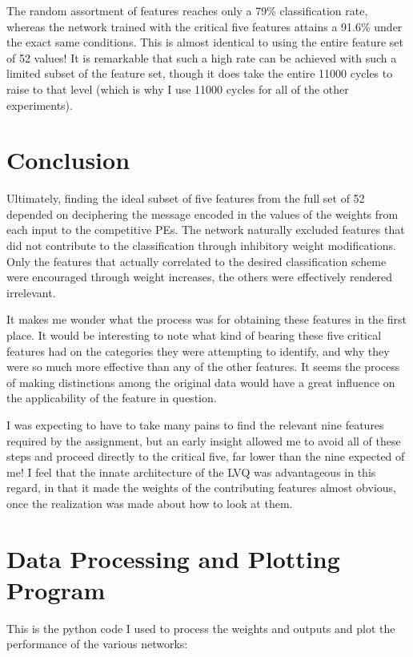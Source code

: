 \documentclass[12pt]{article}
\begin{document}
The random assortment of features reaches only a 79\% classification rate, whereas the network trained with the critical five features attains a 91.6\% under the exact same conditions.  This is almost identical to using the entire feature set of 52 values!  It is remarkable that such a high rate can be achieved with such a limited subset of the feature set, though it does take the entire 11000 cycles to raise to that level (which is why I use 11000 cycles for all of the other experiments).  

\section{Conclusion}

Ultimately, finding the ideal subset of five features from the full set of 52 depended on deciphering the message encoded in the values of the weights from each input to the competitive PEs.  The network naturally excluded features that did not contribute to the classification through inhibitory weight modifications.  Only the features that actually correlated to the desired classification scheme were encouraged through weight increases, the others were effectively rendered irrelevant.  

It makes me wonder what the process was for obtaining these features in the first place.  It would be interesting to note what kind of bearing these five critical features had on the categories they were attempting to identify, and why they were so much more effective than any of the other features.  It seems the process of making distinctions among the original data would have a great influence on the applicability of the feature in question.  

I was expecting to have to take many pains to find the relevant nine features required by the assignment, but an early insight allowed me to avoid all of these steps and proceed directly to the critical five, far lower than the nine expected of me!  I feel that the innate architecture of the LVQ was advantageous in this regard, in that it made the weights of the contributing features almost obvious, once the realization was made about how to look at them.  

\section{Data Processing and Plotting Program}

This is the python code I used to process the weights and outputs and plot the performance of the various networks:
\end{document}
